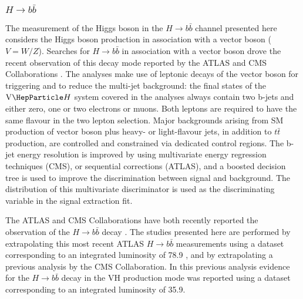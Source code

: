 \subsubsection{$H \to b\bar{b}$}

The measurement of the Higgs boson  in the $H \to b\bar{b}$ channel presented here considers the Higgs boson production in association with a vector boson ($V=W/Z$). 
Searches for $H \to b\bar{b}$  in association with a vector boson drove the recent observation  of this decay mode reported by the ATLAS and CMS Collaborations \cite{Aaboud:2018zhk,Sirunyan:2018kst}.
The analyses make use of leptonic decays of the vector boson for triggering and to reduce the multi-jet background: the final states
of the $\vh$ system covered in the analyses always contain two b-jets and either zero, one or two electrons or muons. Both leptons are required to have the same flavour in the two lepton selection.
Major backgrounds arising from SM production of vector boson plus heavy- or light-flavour jets, in addition to $t\bar{t}$ production, are 
controlled and constrained via dedicated control regions. The  b-jet energy resolution is improved by using multivariate energy regression techniques (CMS), or sequential corrections (ATLAS), and a boosted decision tree is used to improve the discrimination 
between signal and background. The distribution of this multivariate discriminator is used as the discriminating
variable in the signal extraction fit. 

The ATLAS and CMS Collaborations have both recently reported the observation of the $H \to b\bar{b}$ decay \cite{Aaboud:2018zhk,Sirunyan:2018kst}.
The studies presented here are performed by extrapolating this most recent ATLAS $H \to b\bar{b}$ measurements using a dataset corresponding to an integrated luminosity of 78.9 \fbinv, and by extrapolating a previous analysis by the CMS Collaboration. In this previous analysis evidence for the $H \to b\bar{b}$ decay in the $\text{VH}$ production mode was reported using a dataset corresponding to an integrated luminosity of 35.9\fbinv \cite{HIG16044}. 

